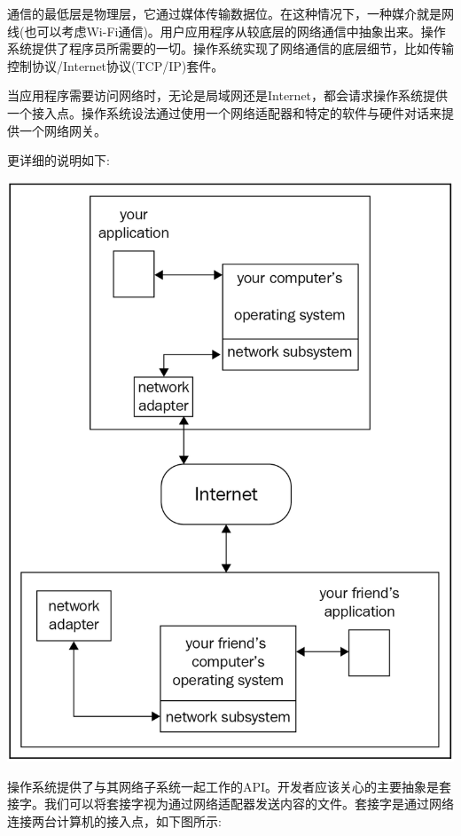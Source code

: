通信的最低层是物理层，它通过媒体传输数据位。在这种情况下，一种媒介就是网线(也可以考虑Wi-Fi通信)。用户应用程序从较底层的网络通信中抽象出来。操作系统提供了程序员所需要的一切。操作系统实现了网络通信的底层细节，比如传输控制协议/Internet协议(TCP/IP)套件。 \par
当应用程序需要访问网络时，无论是局域网还是Internet，都会请求操作系统提供一个接入点。操作系统设法通过使用一个网络适配器和特定的软件与硬件对话来提供一个网络网关。 \par
更详细的说明如下: \par

\begin{center}
	\includegraphics[width=1.0\textwidth]{content/Section-2/Chapter-12/3}
\end{center}

操作系统提供了与其网络子系统一起工作的API。开发者应该关心的主要抽象是套接字。我们可以将套接字视为通过网络适配器发送内容的文件。套接字是通过网络连接两台计算机的接入点，如下图所示: \par

